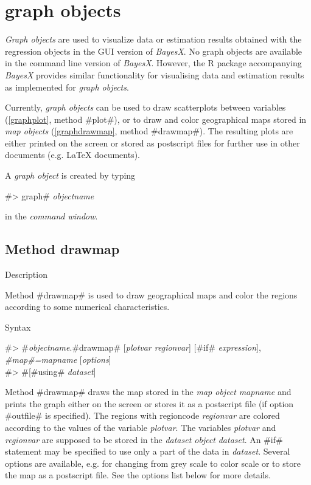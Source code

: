\chapter{graph objects}
\label{graphobj}  

{\em Graph objects} are used to visualize data or estimation results obtained with the regression objects in the GUI
version of {\em BayesX}. No graph objects are available in the command line version of {\it BayesX}. However, the R package
accompanying {\it BayesX} provides similar functionality for visualising data and estimation results as implemented for {\it
graph objects}.

Currently, {\em graph objects} can be used to draw scatterplots between variables (\autoref{graphplot}, method #plot#), or to
draw and color geographical maps stored in {\em map objects} (\autoref{graphdrawmap}, method #drawmap#). The resulting plots
are either printed on the screen or stored as postscript files for further use in other documents (e.g. \LaTeX\/ documents).

A {\em graph object} is created by typing

#> graph# {\em objectname}

in the {\em command window}.


\clearpage


\section{Method drawmap}
\label{graphdrawmap} 

\begin{stanza}{Description}

Method #drawmap# is used to draw geographical maps and color the
regions according to some numerical characteristics.
\end{stanza}

\begin{stanza}{Syntax}

 #> #{\em objectname}.#drawmap#  [{\em plotvar regionvar}] [#if# {\em expression}], {\em #map#=mapname} [{\em options}]\\
 #> #[#using# {\em dataset}]

Method #drawmap# draws the map stored in the {\em map object} {\em
mapname} and prints the graph either on the screen or stores it as
a postscript file (if option #outfile# is specified). The regions
with regioncode {\em regionvar} are colored according to the
values of the variable {\em plotvar}. The variables {\em plotvar}
and {\em regionvar} are supposed to be stored in the {\em dataset
object} {\em dataset}. An #if# statement may be specified to use
only a part of the data in {\em dataset}. Several options are
available, e.g. for changing from grey scale to color scale or to
store the map as a postscript file. See the options list below for
more details.
\end{stanza}


